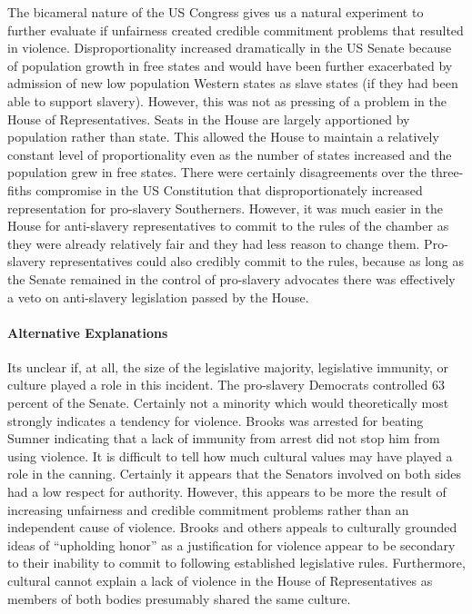 \documentclass[a4paper]{article}\usepackage[]{graphicx}\usepackage[]{color}
\begin{document}
The bicameral nature of the US Congress gives us a natural experiment to further evaluate if unfairness created credible commitment problems that resulted in violence. Disproportionality increased dramatically in the US Senate because of population growth in free states and would have been further exacerbated by admission of new low population Western states as slave states (if they had been able to support slavery). However, this was not as pressing of a problem in the House of Representatives. Seats in the House are largely apportioned by population rather than state. This allowed the House to maintain a relatively constant level of proportionality even as the number of states increased and the population grew in free states. There were certainly disagreements over the three-fiths compromise in the US Constitution that disproportionately increased representation for pro-slavery Southerners. However, it was much easier in the House for anti-slavery representatives to commit to the rules of the chamber as they were already relatively fair and they had less reason to change them. Pro-slavery representatives could also credibly commit to the rules, because as long as the Senate remained in the control of pro-slavery advocates there was effectively a veto on anti-slavery legislation passed by the House.

\paragraph{Alternative Explanations}

Its unclear if, at all, the size of the legislative majority, legislative immunity, or culture played a role in this incident. The pro-slavery Democrats controlled 63 percent of the Senate. Certainly not a minority which would theoretically most strongly indicates a tendency for violence. Brooks was arrested for beating Sumner indicating that a lack of immunity from arrest did not stop him from using violence. It is difficult to tell how much cultural values may have played a role in the canning. Certainly it appears that the Senators involved on both sides had a low respect for authority. However, this appears to be more the result of increasing unfairness and credible commitment problems rather than an independent cause of violence. Brooks and others appeals to culturally grounded ideas of ``upholding honor'' \cite[555]{Pierson1995} as a justification for violence appear to be secondary to their inability to commit to following established legislative rules. Furthermore, cultural cannot explain a lack of violence in the House of Representatives as members of both bodies presumably shared the same culture.
\end{document}
